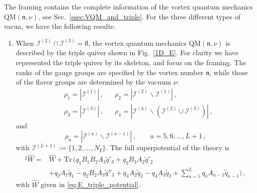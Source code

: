 \documentclass[12pt,a4paper]{article}
\newcommand{\nn}{\mathfrak{n}}
\renewcommand{\(}{\left(}
\renewcommand{\)}{\right)}
\renewcommand{\(}{\left(}
\renewcommand{\)}{\right)}
\begin{document}
The framing contains the complete information of the vortex quantum mechanics $\textrm{QM}(\nn,\nu)$, see Sec.~\ref{ssec:VQM_and_triple}. 
For the three different types of vacua, we have the following results: 
\begin{enumerate}
\item When $\mathcal{I}^{(2)}\cap\mathcal{I}^{(3)} =\emptyset$, the vortex quantum mechanics $\textrm{QM}(\nn,\nu)$ is described by the triple quiver shown in Fig.~\ref{1D_E}. 
For clarity we have represented the triple quiver by its skeleton, and focus on the framing. 
The ranks of the gauge groups are specified by the vortex number $\nn$, while those of the flavor groups are determined by the vacuum $\nu$:
\begin{equation}
\begin{aligned}
&\rho_1=|\mathcal{I}^{(1)}|\,,
&&\rho_2=|\mathcal{I}^{(2)}\backslash \mathcal{I}^{(1)}|\,,\\
&\rho_3=|\mathcal{I}^{(3)}|\,,
&&\rho_4=|\mathcal{I}^{(4)}\backslash(\mathcal{I}^{(2)}\cup\mathcal{I}^{(3)})|\,,
\end{aligned}
\end{equation}
and 
\begin{equation}\label{eq:E_rank_a5}
\rho_a=|\mathcal{I}^{(a)}\backslash \mathcal{I}^{(a-1)}|\,,\qquad a=5,6,\dots,L+1\,,
\end{equation}
with $\mathcal{I}^{(L+1)}:=\{1,2,\dots,N_\mathtt{f}\}$. 
The full superpotential of the theory is
\begin{equation}
\begin{aligned}
{}^\sharp \widehat{W}=&\widehat{W}+\mathrm{Tr}\,(q_1B_1B_2A_3\tilde{q}'_3+q_3B_3A_2\tilde{q}'_2\\
&+q_2A_1\tilde{q}_1-q_2B_2A_3\tilde{q}''_3+q_4A_2\tilde{q}_2-q_4A_3\tilde{q}_3+\sum_{a=5}^{L}q_aA_{a-1}\tilde{q}_{a-1})\,,
\end{aligned}
\end{equation}
with $\widehat{W}$ given in \eqref{eq:E_triple_potential}.


\end{enumerate}
\end{document}
